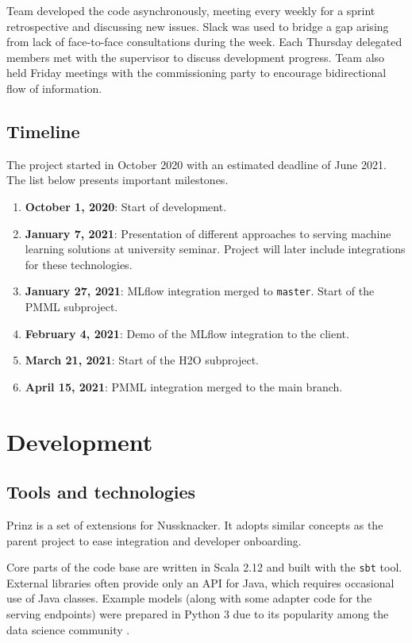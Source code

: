 Team developed the code asynchronously, meeting every weekly for a sprint retrospective and discussing new issues.
Slack was used to bridge a gap arising from lack of face-to-face consultations during the week.
Each Thursday delegated members met with the supervisor to discuss development progress.
Team also held Friday meetings with the commissioning party to encourage bidirectional flow of information.

\subsection{Timeline}

The project started in October 2020 with an estimated deadline of June 2021.
The list below presents important milestones.
\begin{enumerate}
  \item \textbf{October 1, 2020}: Start of development.
  \item \textbf{January 7, 2021}: Presentation of different approaches to serving machine learning solutions at university seminar. Project will later include integrations for these technologies.
  \item \textbf{January 27, 2021}: MLflow integration merged to \texttt{master}. Start of the PMML subproject.
  \item \textbf{February 4, 2021}: Demo of the MLflow integration to the client.
  \item \textbf{March 21, 2021}: Start of the H2O subproject.
  \item \textbf{April 15, 2021}: PMML integration merged to the main branch.
\end{enumerate}

\section{Development}

\subsection{Tools and technologies}

Prinz is a set of extensions for Nussknacker.
It adopts similar concepts as the parent project to ease integration and developer onboarding.

Core parts of the code base are written in Scala 2.12 and built with the \texttt{sbt} tool.
External libraries often provide only an API for Java, which requires occasional use of Java classes.
Example models (along with some adapter code for the serving endpoints) were prepared in Python 3 due to its popularity among the data science community \cite{srinath2017python}.

